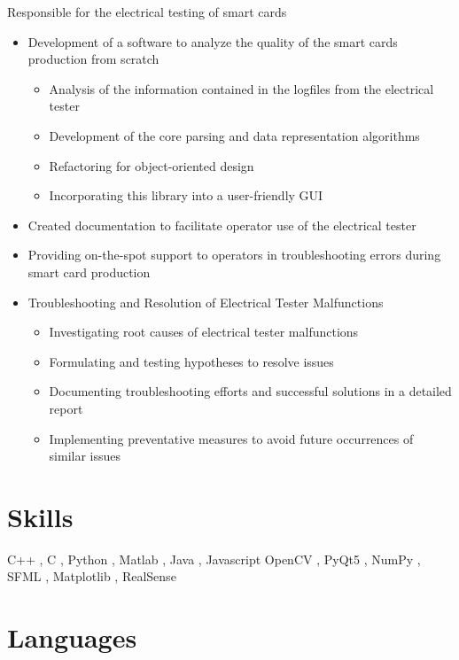 \documentclass[11pt,a4paper]{moderncv}
\begin{document}
    {
    Responsible for the electrical testing of smart cards 
    \begin{itemize}
        \setlength{\itemindent}{1cm}
        \item Development of a software to analyze the quality of the smart cards production from scratch
        \begin{itemize}
            \setlength{\itemindent}{1.5cm}
            \item Analysis of the information contained in the logfiles from the electrical tester
            \item Development of the core parsing and data representation algorithms 
            \item Refactoring for object-oriented design
            \item Incorporating this library into a user-friendly GUI
        \end{itemize}
        \item  Created documentation to facilitate operator use of the electrical tester 
        \item Providing on-the-spot support to operators in troubleshooting errors during smart card production
        \item Troubleshooting and Resolution of Electrical Tester Malfunctions
        \begin{itemize}
            \setlength{\itemindent}{1.5cm}
            \item Investigating root causes of electrical tester malfunctions
            \item Formulating and testing hypotheses to resolve issues
            \item Documenting troubleshooting efforts and successful solutions in a detailed report
            \item Implementing preventative measures to avoid future occurrences of similar issues
        \end{itemize}
    \end{itemize}
    }
    
\section{Skills}

    {C++ , C  , Python  , Matlab  , Java  , Javascript  }
    {OpenCV  , PyQt5  , NumPy  , SFML  , Matplotlib , RealSense }

\section{Languages}
\end{document}
